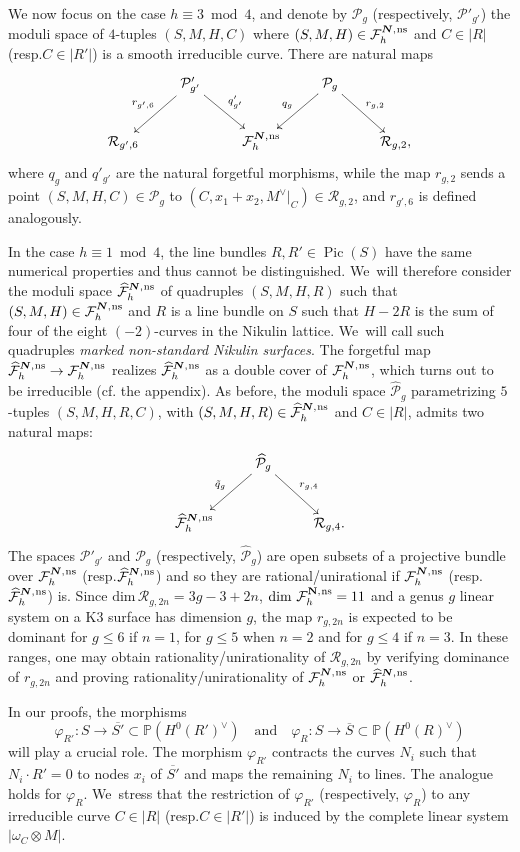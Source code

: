 \documentclass[11pt]{article}
\newcommand{\cf}{cf.\xspace}
\newcommand{\resp}{resp.\xspace}
\newcommand{\quand}{\quad\text{and}\quad}
\newcommand{\ns}{{\mkern1mu\mathrm{ns}}}
\newcommand{\bN}{\boldsymbol{N}}
\theoremstyle{plain}
\theoremstyle{definition}
\DeclareMathOperator{\Pic}{Pic}
\newcommand\PP{{\mathbb P}}
\newcommand\F{{\mathcal F}}
\renewcommand\P{{\mathcal P}}
\newcommand\R{{\mathcal R}}
\begin{document}
We now focus on the case $h \equiv 3 \bmod 4$, and denote by $\P_{g}$ (respectively, $\P'_{g'}$) the moduli space of $4$-tuples $(S,M,H,C)$ where $(S,M,H)\in \F_h^{\bN,\ns}$ and $C\in |R|$ (\resp $C\in |R'|$) is a smooth irreducible curve. There are natural maps
\[
\xymatrix{
&\P'_{g'}\ar[ld]_{r_{g',6}} \ar[rd]^{q'_{g'}}&&\P_{g} \ar[ld]_{q_{g}} \ar[rd]^{r_{g,2}} &\\
\R_{g',6}&&\F_h^{\bN,\ns}& &\R_{g,2},
}
\]
where $q_{g}$ and $q'_{g'}$ are the natural forgetful morphisms, while the map $r_{g,2}$ sends a point \linebreak $(S,M,H,C)\in \P_{g}$ to $(C,x_1+x_2,M^\vee|_C)\in \mathcal R_{g,2}$, and $r_{g',6}$ is defined analogously.

In the case $h \equiv 1 \bmod 4$, the line bundles $R,R'\in \Pic(S)$ have the same numerical properties and thus cannot be distinguished. We~will therefore consider the moduli space $\widehat{\F}_h^{\bN,\ns}$ of quadruples $(S,M,H,R)$ such that $(S,M,H) \in \F_h^{\bN,\ns}$ and $R$ is a line bundle on $S$ such that $H-2R$ is the sum of four of the eight $(-2)$-curves in the Nikulin lattice. We~will call such quadruples {\it marked non-standard Nikulin surfaces}.
The forgetful map $\widehat{\F}_h^{\bN,\ns} \to \F_h^{\bN,\ns}$ realizes $\widehat{\F}_h^{\bN,\ns}$ as a double cover of $\F_h^{\bN,\ns}$, which turns out to be irreducible (\cf the appendix). As before, the moduli space ${\widehat\P}_{g}$ parametrizing $5$-tuples $(S,M,H,R,C)$, with $(S,M,H,R)\in \widehat{\F}_h^{\bN,\ns}$ and $C\in |R|$, admits two natural maps:
\[
\xymatrix{
&{\widehat\P}_{g} \ar[ld]_{\tilde q_{g}} \ar[rd]^{r_{g,4}} &\\
\widehat{\F}_h^{\bN,\ns}& &\R_{g,4}.
}
\]
The spaces $\P'_{g'}$ and $\P_{g}$ (respectively, ${\widehat\P}_{g}$) are open subsets of a projective bundle over $\F_h^{\bN,\ns}$ (\resp $\widehat{\F}_h^{\bN,\ns}$) and so they are rational/unirational if $\F_h^{\bN,\ns}$ (\resp $\widehat{\F}_h^{\bN,\ns}$) is. Since $\mathrm{dim}\,\mathcal R_{g,2n}=3g-3+2n$, $\dim\,\mathcal F_h^{\mathbf N,\ns} =11$ and a genus $g$ linear system on a K3 surface has dimension $g$, the map $r_{g,2n}$ is expected to be dominant for $g\leq 6$ if $n=1$, for $g\leq 5$ when $n=2$ and for $g\leq 4$ if $n=3$. In these ranges, one may obtain rationality/unirationality of $\mathcal R_{g,2n}$ by verifying dominance of $r_{g,2n}$ and proving rationality/unirationality of $\F_h^{\bN,\ns}$ or $\widehat{\F}_h^{\bN,\ns}$.

In our proofs, the morphisms
\[
\varphi_{R'}:S\to \overline{S'}\subset \PP(H^0(R')^\vee)
\quand
\varphi_{R}:S\to \overline{S}\subset \PP(H^0(R)^\vee)
\]
will play a crucial role. The morphism $\varphi_{R'}$ contracts the curves $N_i$ such that $N_i\cdot R'=0$ to nodes $x_i$ of $\overline{S'}$ and maps the remaining $N_i$ to lines. The analogue holds for $\varphi_{R}$. We~stress that the restriction of $\varphi_{R'}$ (respectively, $\varphi_{R}$) to any irreducible curve $C\in |R|$ (\resp $C\in |R'|$) is induced by the complete linear system $\vert \omega_C\otimes M\vert$.
\end{document}
